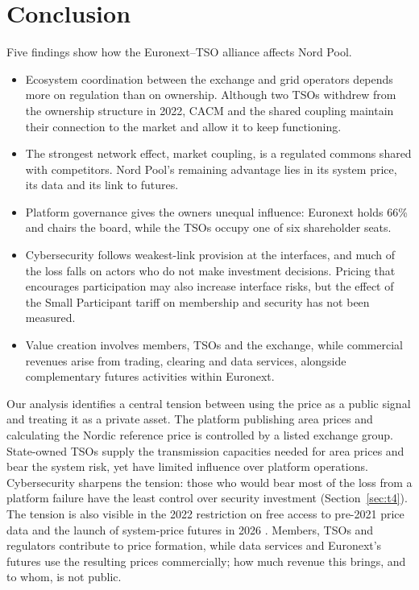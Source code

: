 \section{Conclusion}
\label{sec:conclusion}

Five findings show how the Euronext--TSO alliance affects Nord Pool.

\begin{itemize}
  \item Ecosystem coordination between the exchange and grid operators depends more on regulation than on ownership. Although two TSOs withdrew from the ownership structure in 2022, CACM and the shared coupling maintain their connection to the market and allow it to keep functioning.
  \item The strongest network effect, market coupling, is a regulated commons shared with competitors. Nord Pool's remaining advantage lies in its system price, its data and its link to futures.
  \item Platform governance gives the owners unequal influence: Euronext holds 66\% and chairs the board, while the TSOs occupy one of six shareholder seats.
  \item Cybersecurity follows weakest-link provision at the interfaces, and much of the loss falls on actors who do not make investment decisions. Pricing that encourages participation may also increase interface risks, but the effect of the Small Participant tariff on membership and security has not been measured.
  \item Value creation involves members, TSOs and the exchange, while commercial revenues arise from trading, clearing and data services, alongside complementary futures activities within Euronext.
\end{itemize}

Our analysis identifies a central tension between using the price as a public signal and treating it as a private asset. The platform publishing area prices and calculating the Nordic reference price is controlled by a listed exchange group. State-owned TSOs supply the transmission capacities needed for area prices and bear the system risk, yet have limited influence over platform operations. Cybersecurity sharpens the tension: those who would bear most of the loss from a platform failure have the least control over security investment (Section~\ref{sec:t4}). The tension is also visible in the 2022 restriction on free access to pre-2021 price data \citep{ERR2022} and the launch of system-price futures in 2026 \citep{Euronext2026}. Members, TSOs and regulators contribute to price formation, while data services and Euronext's futures use the resulting prices commercially; how much revenue this brings, and to whom, is not public.

